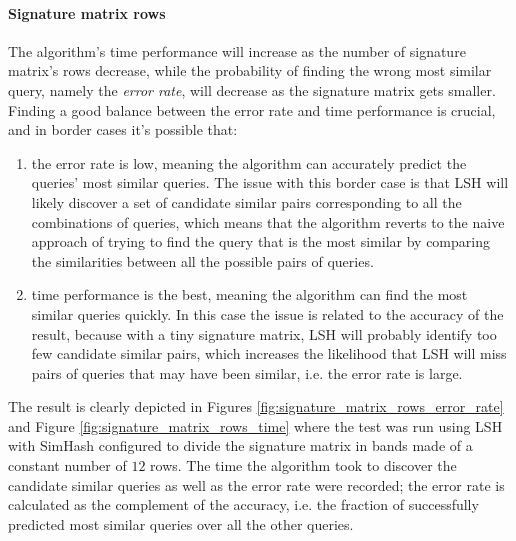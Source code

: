 \paragraph{Signature matrix rows} The algorithm's time performance will increase as the number of signature matrix's rows decrease, while the probability of finding the wrong most similar query, namely the \emph{error rate}, will decrease as the signature matrix gets smaller. Finding a good balance between the error rate and time performance is crucial, and in border cases it's possible that:
\begin{enumerate}
    \item the error rate is low, meaning the algorithm can accurately predict the queries' most similar queries. The issue with this border case is that LSH will likely discover a set of candidate similar pairs corresponding to all the combinations of queries, which means that the algorithm reverts to the naive approach of trying to find the query that is the most similar by comparing the similarities between all the possible pairs of queries. 
    \item time performance is the best, meaning the algorithm can find the most similar queries quickly. In this case the issue is related to the accuracy of the result, because with a tiny signature matrix, LSH will probably identify too few candidate similar pairs, which increases the likelihood that LSH will miss pairs of queries that may have been similar, i.e. the error rate is large.
\end{enumerate}

The result is clearly depicted in Figures \ref{fig:signature_matrix_rows_error_rate} and Figure \ref{fig:signature_matrix_rows_time} where the test was run using LSH with SimHash configured to divide the signature matrix in bands made of a constant number of $12$ rows. The time the algorithm took to discover the candidate similar queries as well as the error rate were recorded; the error rate is calculated as the complement of the accuracy, i.e. the fraction of successfully predicted most similar queries over all the other queries. 




